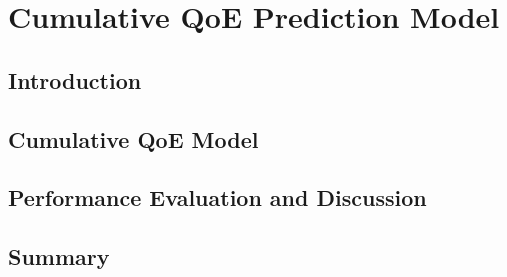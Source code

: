 \chapter{Cumulative QoE Prediction Model}
\label{ch:Cumulative}


\renewcommand{\SectionsDir}{Chapter5/Sections}
\renewcommand{\FigsDir}{Chapter5/Figs}
\renewcommand{\TablesDir}{Chapter5/Tables}


\section{Introduction}
\label{Cumulative:sec:Introduction}


\section{Cumulative QoE Model}
\label{Cumulative:sec:Proposals}


\section{Performance Evaluation and Discussion}
\label{Cumulative:sec:Evaluation}


\section{Summary}
\label{Cumulative:sec:Summary}
